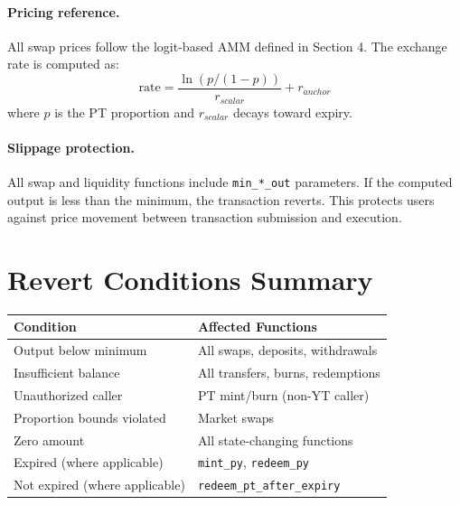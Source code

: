 \paragraph{Pricing reference.}
All swap prices follow the logit-based AMM defined in Section 4. The exchange rate is computed as:
\[
\text{rate} = \frac{\ln(p/(1-p))}{r_{scalar}} + r_{anchor}
\]
where $p$ is the PT proportion and $r_{scalar}$ decays toward expiry.

\paragraph{Slippage protection.}
All swap and liquidity functions include \texttt{min\_*\_out} parameters. If the computed output is less than the minimum, the transaction reverts. This protects users against price movement between transaction submission and execution.


\section{Revert Conditions Summary}

\begin{center}
\begin{tabular}{l l}
\toprule
\textbf{Condition} & \textbf{Affected Functions} \\
\midrule
Output below minimum & All swaps, deposits, withdrawals \\
Insufficient balance & All transfers, burns, redemptions \\
Unauthorized caller & PT mint/burn (non-YT caller) \\
Proportion bounds violated & Market swaps \\
Zero amount & All state-changing functions \\
Expired (where applicable) & \texttt{mint\_py}, \texttt{redeem\_py} \\
Not expired (where applicable) & \texttt{redeem\_pt\_after\_expiry} \\
\bottomrule
\end{tabular}
\end{center}
